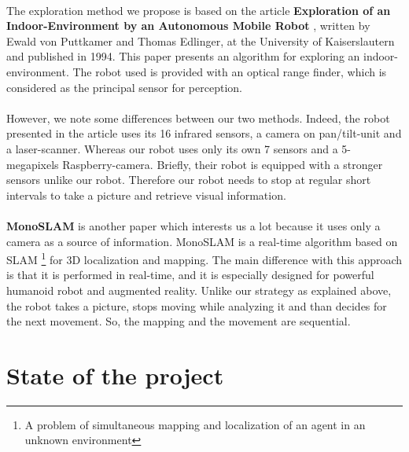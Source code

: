 \documentclass[12pt]{report}
\begin{document}
\paragraph {}
The exploration method we propose is based on the article \textbf {Exploration of an Indoor-Environment by an Autonomous Mobile Robot} \cite{edlinger_exploration_1994}, written by Ewald von Puttkamer and Thomas Edlinger, at the University of Kaiserslautern and published in 1994. This paper presents an algorithm for exploring an indoor-environment. The robot used is provided with an optical range finder, which is considered as the principal sensor for perception. 

\paragraph {}
However, we note some differences between our two methods. Indeed, the robot presented in the article uses its 16 infrared sensors, a camera on pan/tilt-unit and a laser-scanner. Whereas our robot uses only its own 7 sensors and a  5-megapixels Raspberry-camera. Briefly, their robot is equipped with a stronger sensors unlike our robot. Therefore our robot needs to stop at regular short intervals to take a picture and retrieve visual information. 

\paragraph {}
\textbf{MonoSLAM} \cite{davison_monoslam:_2007} is another paper which interests us a lot because it uses only a camera as a source of information. MonoSLAM is a real-time algorithm based on SLAM \footnote{A problem of simultaneous mapping and localization of an agent in an unknown environment} for 3D localization and mapping. The main difference with this approach is that it is performed in real-time, and it is especially designed for powerful humanoid robot and augmented reality. Unlike our strategy as explained above, the robot takes a picture, stops moving while analyzing it and than decides for the next movement. So, the mapping and the movement are sequential. 
\section{State of the project}
\end{document}

